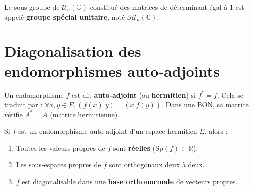 \documentclass[french]{yLectureNote}
\begin{document}
\begin{definition}
    Le sous-groupe de $\mathcal{U}_n(\mathbb{C})$ constitué des matrices de déterminant égal à 1 est appelé \textbf{groupe spécial unitaire}, noté $\mathcal{SU}_n(\mathbb{C})$.
\end{definition}



\section{Diagonalisation des endomorphismes auto-adjoints}

\begin{definition}
    Un endomorphisme $f$ est dit \textbf{auto-adjoint} (ou \textbf{hermitien}) si $f^* = f$.
    Cela se traduit par : $\forall x,y \in E, (f(x)|y) = (x|f(y))$.
    Dans une BON, sa matrice vérifie $A^* = A$ (matrice hermitienne).
\end{definition}

\begin{theorem}
    Si $f$ est un endomorphisme auto-adjoint d'un espace hermitien $E$, alors :
    \begin{enumerate}
        \item Toutes les valeurs propres de $f$ sont \textbf{réelles} ($\text{Sp}(f) \subset \mathbb{R}$).
        \item Les sous-espaces propres de $f$ sont orthogonaux deux à deux.
        \item $f$ est diagonalisable dans une \textbf{base orthonormale} de vecteurs propres.
    \end{enumerate}
\end{theorem}
\end{document}
